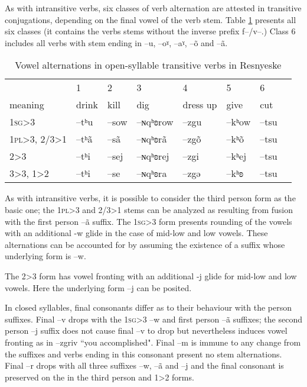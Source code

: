 \documentclass[oldfontcommands,oneside,a4paper,11pt]{article}
\newcommand{\ipa}[1]{{\phon #1}} %
\begin{document}
As with intransitive verbs, six classes of verb alternation are attested in transitive conjugations, depending on the final vowel of the verb stem. Table \ref{tab:open.tr} presents all six classes (it contains the verbs stems without the inverse prefix \ipa{f}--/\ipa{v}--.) Class 6  includes all verbs with stem ending in --\ipa{u}, --\ipa{oˠ}, --\ipa{aˠ}, --\ipa{õ} and --\ipa{ã}.

\begin{table}[H]
\caption{Vowel alternations in open-syllable transitive verbs in Resnyeske} \label{tab:open.tr} \centering
\begin{tabular}{llll|ll|ll}
\toprule
&1&2&3&4&5&6 \\
meaning &	drink & kill & dig & dress up & give &cut
\\
\midrule
\textsc{1sg>3}&	--\ipa{tʰu}&--\ipa{sow}&--\ipa{ɴqʰʚrow}&--\ipa{zgu}&--\ipa{kʰow}&--\ipa{tsu}&
\\
\textsc{1pl>3}, 2/3>1& --\ipa{tʰã}&--\ipa{sã}&--\ipa{ɴqʰʚrã}&--\ipa{zgõ}&--\ipa{kʰõ}&--\ipa{tsu}&
\\
2>3& --\ipa{tʰi}&--\ipa{sej}&--\ipa{ɴqʰʚrej}&--\ipa{zgi}&--\ipa{kʰej}&--\ipa{tsu}&
\\
3>3, 1>2&--\ipa{tʰi}&--\ipa{se}&--\ipa{ɴqʰʚra}&--\ipa{zgə}&--\ipa{kʰʚ}&--\ipa{tsu}&
\\
\bottomrule
\end{tabular}
\end{table}
As with intransitive verbs, it is possible to consider the third person form as  the basic one; the \textsc{1pl>3} and 2/3>1 stems can be analyzed as resulting from fusion with the first person --\ipa{ã} suffix. 
The \textsc{1sg>3} form presents rounding of the vowels with an additional \ipa{-w} glide in the case of mid-low and low vowels. These alternations can be accounted for by assuming the existence of a suffix whose underlying form is \ipa{--w}.

The \textsc{2>3} form has vowel fronting with an additional \ipa{-j} glide for  mid-low and low vowels. Here the underlying form \ipa{--j} can be posited.

In closed syllables, final consonants differ as to their behaviour with the person suffixes. Final \ipa{--v} drops with the \textsc{1sg>3} --\ipa{w} and first person --\ipa{ã} suffixes; the second person \ipa{--j} suffix does not cause final --\ipa{v} to drop but nevertheless induces vowel fronting as in --\ipa{zgriv} ``you accomplished". Final --\ipa{m} is immune to any change from the suffixes and verbs ending in this consonant present no stem alternations. Final --\ipa{r} drops with all three suffixes --\ipa{w}, --\ipa{ã} and --\ipa{j} and the final consonant is preserved on the in the third person and 1>2 forms.
\end{document}
